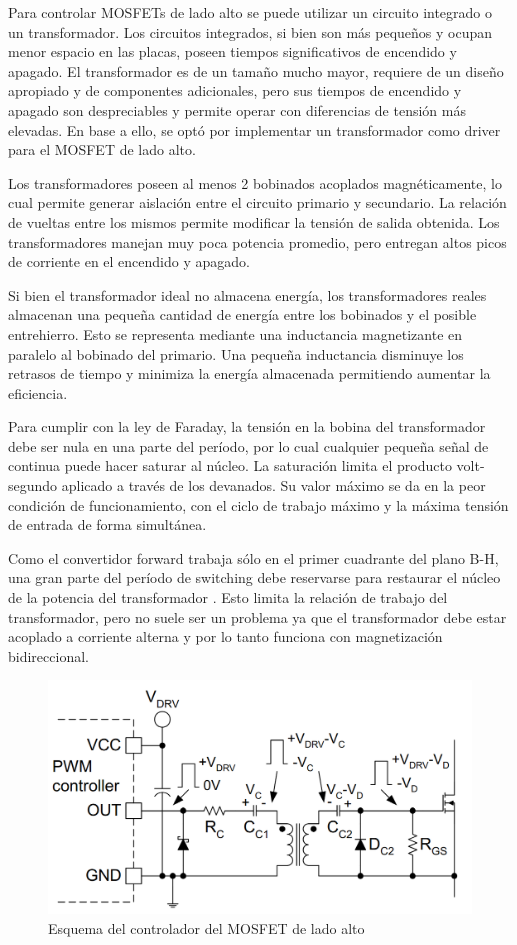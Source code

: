 Para controlar MOSFETs de lado alto se puede utilizar un circuito integrado o un transformador. 
Los circuitos integrados, si bien son más pequeños y ocupan menor espacio en las placas, 
poseen tiempos significativos de encendido y apagado. 
El transformador es de un tamaño mucho mayor, requiere de un diseño apropiado y de componentes adicionales,
pero sus tiempos de encendido y apagado son despreciables y permite operar con diferencias de tensión más elevadas.
En base a ello, se optó por implementar un transformador como driver para el MOSFET de lado alto. 

Los transformadores poseen al menos 2 bobinados acoplados magnéticamente, 
lo cual permite generar aislación entre el circuito primario y secundario. 
La relación de vueltas entre los mismos permite modificar la tensión de salida obtenida. 
Los transformadores manejan muy poca potencia promedio, pero entregan altos picos de corriente en el encendido y apagado.

Si bien el transformador ideal no almacena energía, los transformadores reales 
almacenan una pequeña cantidad de energía entre los bobinados y el posible entrehierro. 
Esto se representa mediante una inductancia magnetizante en paralelo al bobinado del primario. 
Una pequeña inductancia disminuye los retrasos de tiempo y minimiza la energía almacenada permitiendo aumentar la eficiencia. 

Para cumplir con la ley de Faraday, la tensión en la bobina del transformador debe ser nula en una parte del período, 
por lo cual cualquier pequeña señal de continua puede hacer saturar al núcleo. 
La saturación limita el producto volt-segundo aplicado a través de los devanados. 
Su valor máximo se da en la peor condición de funcionamiento, con el ciclo de trabajo máximo y la máxima tensión de entrada de forma simultánea. 

Como el convertidor forward trabaja sólo en el primer cuadrante del plano B-H, una gran parte del período de switching debe reservarse para restaurar el núcleo de la potencia del transformador \cite{hart_espanol}.
Esto limita la relación de trabajo del transformador, pero no suele ser un problema ya que 
el transformador debe estar acoplado a corriente alterna y por lo tanto funciona con magnetización bidireccional.

\begin{figure}[H]
    \centering
    \includegraphics[width=\textwidth]{images/esquema_driver.png}
    \caption{Esquema del controlador del MOSFET de lado alto}
    \label{fig:driver}
\end{figure}

